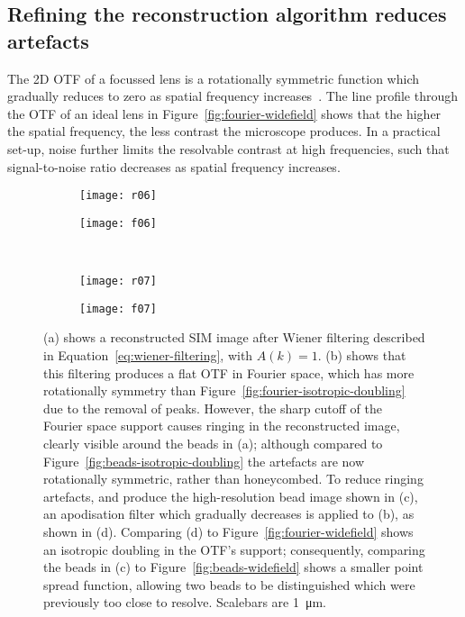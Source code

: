 \newpage
\subsection{Refining the reconstruction algorithm reduces artefacts} \label{sec:sim-artefacts}
The 2D OTF of a focussed lens is a rotationally symmetric function which gradually reduces to zero as spatial frequency increases~\cite{williams2002introduction}.
The line profile through the OTF of an ideal lens in Figure~\ref{fig:fourier-widefield} shows that the higher the spatial frequency, the less contrast the microscope produces.
In a practical set-up, noise further limits the resolvable contrast at high frequencies, such that signal-to-noise ratio decreases as spatial frequency increases.

\begin{figure}[tbp]
\vspace{-6pt} \centering
\begin{subfigure}[b]{0.45\textwidth}
	\texttt{[image: r06]}
	\caption{}\label{fig:beads-wiener}
\end{subfigure}
\raisebox{9.3em}{\noindent\Huge$\Leftrightarrow$}
\begin{subfigure}[b]{0.45\textwidth}
	\texttt{[image: f06]}
	\caption{}\label{fig:fourier-wiener}
\end{subfigure}

~\newline
\begin{subfigure}[b]{0.45\textwidth}
	\texttt{[image: r07]}
	\caption{}\label{fig:beads-apodised}
\end{subfigure}
\raisebox{9.3em}{\noindent\Huge$\Leftrightarrow$}
\begin{subfigure}[b]{0.45\textwidth}
	\texttt{[image: f07]}
	\caption{}\label{fig:fourier-apodised}
\end{subfigure}
\caption[LAG SIM: Wiener filtering of the SIM OTF is required for artefact-free reconstruction]{(a) shows a reconstructed SIM image after Wiener filtering described in Equation~\ref{eq:wiener-filtering}, with $A\left(k\right) = 1$.
(b) shows that this filtering produces a flat OTF in Fourier space, which has more rotationally symmetry than Figure~\ref{fig:fourier-isotropic-doubling} due to the removal of peaks.
However, the sharp cutoff of the Fourier space support causes ringing in the reconstructed image, clearly visible around the beads in (a); although compared to Figure~\ref{fig:beads-isotropic-doubling} the artefacts are now rotationally symmetric, rather than honeycombed.
To reduce ringing artefacts, and produce the high-resolution bead image shown in (c), an apodisation filter which gradually decreases is applied to (b), as shown in (d).
Comparing (d) to Figure~\ref{fig:fourier-widefield} shows an isotropic doubling in the OTF's support; consequently, comparing the beads in (c) to Figure~\ref{fig:beads-widefield} shows a smaller point spread function, allowing two beads to be distinguished which were previously too close to resolve. Scalebars are \SI{1}{\micro\metre}.}
\label{fig:sim-OTFs}
\end{figure}

